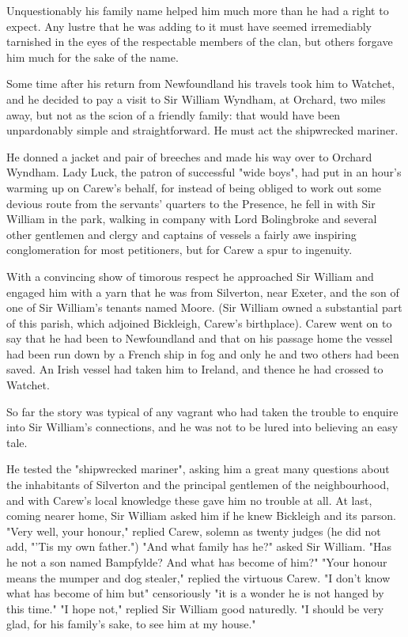 Unquestionably his family name helped him much more than he had a right to expect. Any lustre that he was adding to it must have seemed irremediably tarnished in the eyes of the respectable members of the clan, but others forgave him much for the sake of the name.

Some time after his return from Newfoundland his travels took him to Watchet, and he decided to pay a visit to Sir William Wyndham, at Orchard, two miles away, but not as the scion of a friendly family: that would have been unpardonably simple and straightforward. He must act the shipwrecked mariner.

He donned a jacket and pair of breeches and made his way over to Orchard Wyndham. Lady Luck, the patron of successful "wide boys", had put in an hour's warming up on Carew's behalf, for instead of being obliged to work out some devious route from the servants' quarters to the Presence, he fell in with Sir William in the park, walking in company with Lord Bolingbroke and several other gentlemen and clergy and captains of vessels   a fairly awe inspiring conglomeration for most petitioners, but for Carew a spur to ingenuity.

With a convincing show of timorous respect he approached Sir William and engaged him with a yarn that he was from Silverton, near Exeter, and the son of one of Sir William's tenants named Moore. (Sir William owned a substantial part of this parish, which adjoined Bickleigh, Carew's birthplace). Carew went on to say that he had been to Newfoundland and that on his passage home the vessel had been run down by a French ship in fog and only he and two others had been saved. An Irish vessel had taken him to Ireland, and thence he had crossed to Watchet.

So far the story was typical of any vagrant who had taken the trouble to enquire into Sir William's connections, and he was not to be lured into believing an easy tale.

He tested the "shipwrecked mariner", asking him a great many questions about the inhabitants of Silverton and the principal gentlemen of the neighbourhood, and with Carew's local knowledge these gave him no trouble at all.
 At last, coming nearer home, Sir William asked him if he knew Bickleigh and its parson.
 "Very well, your honour," replied Carew, solemn as twenty judges (he did not add, "'Tis my own father.")
 "And what family has he?" asked Sir William. "Has he not a son named Bampfylde? And what has become of him?"
 "Your honour means the mumper and dog stealer," replied the virtuous Carew. "I don't know what has become of him but"   censoriously   "it is a wonder he is not hanged by this time."
 "I hope not," replied Sir William good naturedly. "I should be very glad, for his family's sake, to see him at my house."

